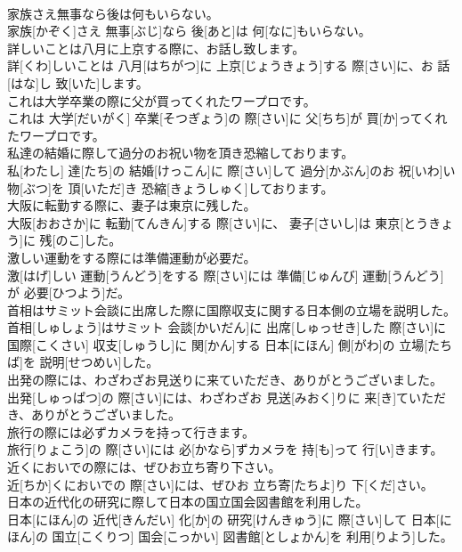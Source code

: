 \documentclass[8pt]{extreport}
\begin{document}
\begin{CJK}{UTF8}{min}
\\	家族さえ無事なら後は何もいらない。	
\\	家族[かぞく]さえ 無事[ぶじ]なら 後[あと]は 何[なに]もいらない。
\\	詳しいことは八月に上京する際に、お話し致します。	
\\	詳[くわ]しいことは 八月[はちがつ]に 上京[じょうきょう]する 際[さい]に、お 話[はな]し 致[いた]します。
\\	これは大学卒業の際に父が買ってくれたワープロです。	
\\	これは 大学[だいがく] 卒業[そつぎょう]の 際[さい]に 父[ちち]が 買[か]ってくれたワープロです。
\\	私達の結婚に際して過分のお祝い物を頂き恐縮しております。	
\\	私[わたし] 達[たち]の 結婚[けっこん]に 際[さい]して 過分[かぶん]のお 祝[いわ]い 物[ぶつ]を 頂[いただ]き 恐縮[きょうしゅく]しております。
\\	大阪に転勤する際に、妻子は東京に残した。	
\\	大阪[おおさか]に 転勤[てんきん]する 際[さい]に、 妻子[さいし]は 東京[とうきょう]に 残[のこ]した。
\\	激しい運動をする際には準備運動が必要だ。	
\\	激[はげ]しい 運動[うんどう]をする 際[さい]には 準備[じゅんび] 運動[うんどう]が 必要[ひつよう]だ。
\\	首相はサミット会談に出席した際に国際収支に関する日本側の立場を説明した。	
\\	首相[しゅしょう]はサミット 会談[かいだん]に 出席[しゅっせき]した 際[さい]に 国際[こくさい] 収支[しゅうし]に 関[かん]する 日本[にほん] 側[がわ]の 立場[たちば]を 説明[せつめい]した。
\\	出発の際には、わざわざお見送りに来ていただき、ありがとうございました。	
\\	出発[しゅっぱつ]の 際[さい]には、わざわざお 見送[みおく]りに 来[き]ていただき、ありがとうございました。
\\	旅行の際には必ずカメラを持って行きます。	
\\	旅行[りょこう]の 際[さい]には 必[かなら]ずカメラを 持[も]って 行[い]きます。
\\	近くにおいでの際には、ぜひお立ち寄り下さい。	
\\	近[ちか]くにおいでの 際[さい]には、ぜひお 立ち寄[たちよ]り 下[くだ]さい。
\\	日本の近代化の研究に際して日本の国立国会図書館を利用した。	
\\	日本[にほん]の 近代[きんだい] 化[か]の 研究[けんきゅう]に 際[さい]して 日本[にほん]の 国立[こくりつ] 国会[こっかい] 図書館[としょかん]を 利用[りよう]した。

\end{CJK}
\end{document}
